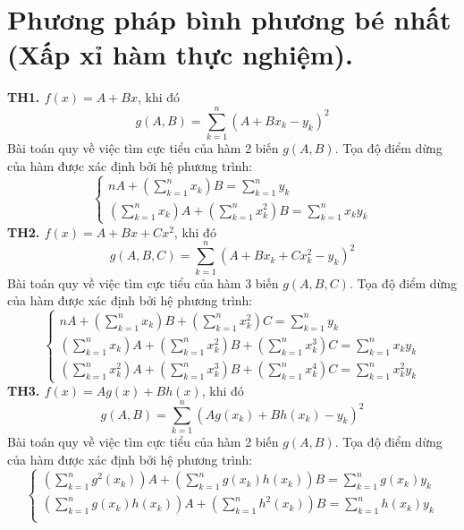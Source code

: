 \documentclass[12pt, a4paper]{report}
\begin{document}
\section{Phương pháp bình phương bé nhất (Xấp xỉ hàm thực nghiệm).}
\textbf{TH1. $f(x)=A+Bx$}, khi đó
\[
    g(A,B) = \sum_{k=1}^{n} (A+Bx_k - y_k)^2  
\]
Bài toán quy về việc tìm cực tiểu của hàm 2 biến $g(A,B)$. Tọa độ điểm dừng của hàm được xác định bởi hệ phương trình: 
\[
    \begin{cases}
        nA + \left( \displaystyle \sum_{k=1}^{n} x_k \right) B = \displaystyle \sum_{k=1}^{n} y_k \\
        \left( \displaystyle \sum_{k=1}^{n} x_k \right) A + \left( \displaystyle \sum_{k=1}^{n} x^2_k \right) B = \displaystyle \sum_{k=1}^{n} x_k y_k
    \end{cases}    
\]
\textbf{TH2. $f(x) = A + Bx + Cx^2$}, khi đó
\[
    g(A,B,C) = \sum_{k=1}^{n} (A+Bx_k + Cx^2_k- y_k)^2  
\]
Bài toán quy về việc tìm cực tiểu của hàm 3 biến $g(A,B,C)$. Tọa độ điểm dừng của hàm được xác định bởi hệ phương trình: 
\[
    \begin{cases}
        nA + \left( \displaystyle \sum_{k=1}^{n} x_k \right) B + \left( \displaystyle \sum_{k=1}^{n} x^2_k \right) C= \displaystyle \sum_{k=1}^{n} y_k \\
        \left( \displaystyle \sum_{k=1}^{n} x_k \right) A + \left( \displaystyle \sum_{k=1}^{n} x^2_k \right) B + \left( \displaystyle \sum_{k=1}^{n} x^3_k \right) C= \displaystyle \sum_{k=1}^{n} x_k y_k \\
        \left( \displaystyle \sum_{k=1}^{n} x^2_k \right) A + \left( \displaystyle \sum_{k=1}^{n} x^3_k \right) B + \left( \displaystyle \sum_{k=1}^{n} x^4_k \right) C= \displaystyle \sum_{k=1}^{n} x^2_k y_k
    \end{cases}      
\]
\textbf{TH3. $f(x) = Ag(x) + Bh(x)$}, khi đó
\[
    g(A,B) = \sum_{k=1}^{n} (Ag(x_k) + Bh(x_k) - y_k)^2  
\]
Bài toán quy về việc tìm cực tiểu của hàm 2 biến $g(A,B)$. Tọa độ điểm dừng của hàm được xác định bởi hệ phương trình: 
\[
    \begin{cases}
        \left( \displaystyle \sum_{k=1}^{n} g^2(x_k) \right) A + \left( \displaystyle \sum_{k=1}^{n} g(x_k)h(x_k) \right) B = \displaystyle \sum_{k=1}^{n} g(x_k)y_k \\
        \left( \displaystyle \sum_{k=1}^{n} g(x_k)h(x_k) \right) A + \left( \displaystyle \sum_{k=1}^{n} h^2(x_k) \right) B = \displaystyle \sum_{k=1}^{n} h(x_k)y_k \\
    \end{cases}  
\]
\newpage
\end{document}
